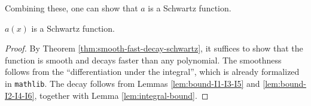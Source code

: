 Combining these, one can show that $a$ is a Schwartz function.
\begin{proposition}\label{prop:a-schwartz}\leanok
{}
$a(x)$ is a Schwartz function.
\end{proposition}
\begin{proof}
By Theorem \ref{thm:smooth-fast-decay-schwartz}, it suffices to show that the function is smooth and decays faster than any polynomial.
The smoothness follows from the ``differentiation under the integral'', which is already formalized in \texttt{mathlib}.
The decay follows from Lemmas \ref{lem:bound-I1-I3-I5} and \ref{lem:bound-I2-I4-I6}, together with Lemma \ref{lem:integral-bound}.
\end{proof}


